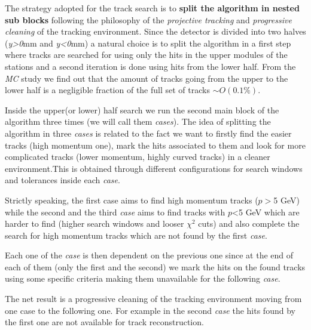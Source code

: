 \documentclass[paper=a4, fontsize=10pt]{scrartcl}
\numberwithin{equation}{section}		%
\numberwithin{figure}{section}			%
\numberwithin{table}{section}				%
\begin{document}
The strategy adopted for the track search is to \textbf{split the algorithm in nested sub blocks} following the philosophy of the \textit{projective tracking} and \textit{progressive cleaning} of the tracking environment. Since the detector is divided into two halves (\textit{y>0}mm and \textit{y<0}mm) a natural choice is to split the algorithm in a first step where tracks are searched for using only the hits in the upper modules of the stations and a second iteration is done using hits from the lower half.
From the \textit{MC} study we find out that the amount of tracks going from the upper to the lower half is a negligible fraction of the full set of tracks \textit{$\sim O(0.1 \%)$}. 

Inside the upper(or lower) half search we run the second main block of the algorithm three times (we will call them \textit{cases}). The idea of splitting the algorithm in three \textit{cases} is related to the fact we want to firstly find the easier tracks (high momentum one), mark the hits associated to them and look for more complicated tracks (lower momentum, highly curved tracks) in a cleaner environment.This is obtained through different configurations for search windows and tolerances inside each \textit{case}.

Strictly speaking, the first case aims to find high momentum tracks ($p>$5 GeV) while the second and the third \textit{case} aims to find tracks with $p$<5 GeV which are harder to find (higher search windows and looser $\chi^{2}$ cuts) and also complete the search for high momentum tracks which are not found by the first \textit{case}.

Each one of the \textit{case} is then dependent on the previous one since at the end of each of them (only the first and the second) we mark the hits on the found tracks using some specific criteria making them unavailable for the following \textit{case}.


The net result is a progressive cleaning of the tracking environment moving from one case to the following one. For example in the second \textit{case} the hits found by the first one are not available for track reconstruction.
\end{document}
